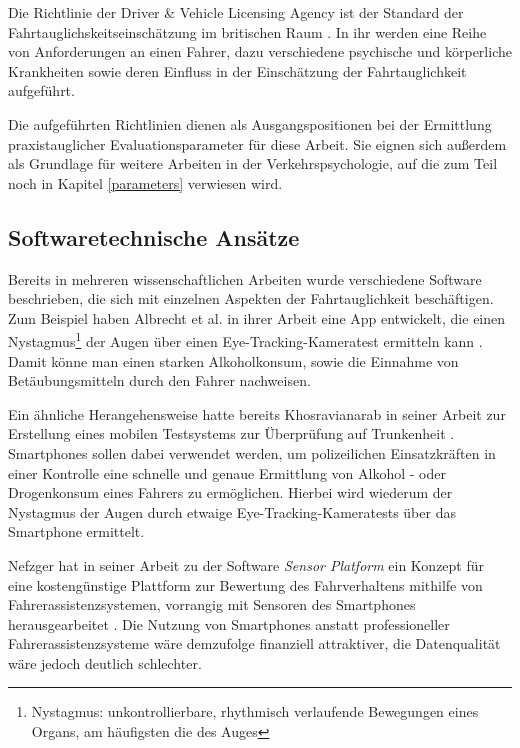 Die Richtlinie der Driver \& Vehicle Licensing Agency ist der Standard der Fahrtauglichskeitseinschätzung im britischen Raum \cite{drivervehiclelicencingagency}. In ihr werden eine Reihe von Anforderungen an einen Fahrer, dazu verschiedene psychische und körperliche Krankheiten sowie deren Einfluss in der Einschätzung der Fahrtauglichkeit aufgeführt.

Die aufgeführten Richtlinien dienen als Ausgangspositionen bei der Ermittlung praxistauglicher Evaluationsparameter für diese Arbeit. Sie eignen sich außerdem als Grundlage für weitere Arbeiten in der Verkehrspsychologie, auf die zum Teil noch in Kapitel \ref{parameters} verwiesen wird.

\subsection{Softwaretechnische Ansätze}

Bereits in mehreren wissenschaftlichen Arbeiten wurde verschiedene Software beschrieben, die sich mit einzelnen Aspekten der Fahrtauglichkeit beschäftigen. Zum Beispiel haben Albrecht et al. in ihrer Arbeit eine App entwickelt, die einen Nystagmus\footnote{\label{foot:nystagmus} Nystagmus: unkontrollierbare, rhythmisch verlaufende Bewegungen eines Organs, am häufigsten die des Auges}  der Augen über einen Eye-Tracking-Kameratest ermitteln kann \cite{mobilesmarttracking}. Damit könne man einen starken Alkoholkonsum, sowie die Einnahme von Betäubungsmitteln durch den Fahrer nachweisen.

Ein ähnliche Herangehensweise hatte bereits Khosravianarab in seiner Arbeit zur Erstellung eines mobilen Testsystems zur Überprüfung auf Trunkenheit \cite{sobrietymobiletests}. Smartphones sollen dabei verwendet werden, um polizeilichen Einsatzkräften in einer Kontrolle eine schnelle und genaue Ermittlung von Alkohol - oder Drogenkonsum eines Fahrers zu ermöglichen. Hierbei wird wiederum der Nystagmus der Augen durch etwaige Eye-Tracking-Kameratests über das Smartphone ermittelt.

Nefzger hat in seiner Arbeit zu der Software \textit{Sensor Platform} ein Konzept für eine kostengünstige Plattform zur Bewertung des Fahrverhaltens mithilfe von Fahrerassistenzsystemen, vorrangig mit Sensoren des Smartphones herausgearbeitet \cite{smartphoneresearchplatform}. Die Nutzung von Smartphones anstatt professioneller Fahrerassistenzsysteme wäre demzufolge finanziell attraktiver, die Datenqualität wäre jedoch deutlich schlechter.

